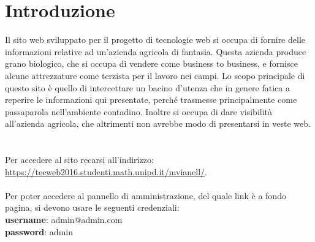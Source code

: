 \newpage
\section{Introduzione}
Il sito web sviluppato per il progetto di tecnologie web si occupa di fornire delle informazioni relative ad un'azienda agricola di fantasia. Questa azienda produce grano biologico, che si occupa di vendere come business to business, e fornisce alcune attrezzature come terzista per il lavoro nei campi.
Lo scopo principale di questo sito è quello di intercettare un bacino d'utenza che in genere fatica a reperire le informazioni qui presentate, perché trasmesse principalmente come passaparola nell'ambiente contadino. Inoltre si occupa di dare visibilità all'azienda agricola, che altrimenti non avrebbe modo di presentarsi in veste web.
~\\ ~\\
Per accedere al sito recarsi all'indirizzo:\\ \url{https://tecweb2016.studenti.math.unipd.it/mvianell/}.~\\ ~\\
Per poter accedere al pannello di amministrazione, del quale link è a fondo pagina, si devono usare le seguenti credenziali:\\ 
\textbf{username}: admin@admin.com\\ 
\textbf{password}: admin